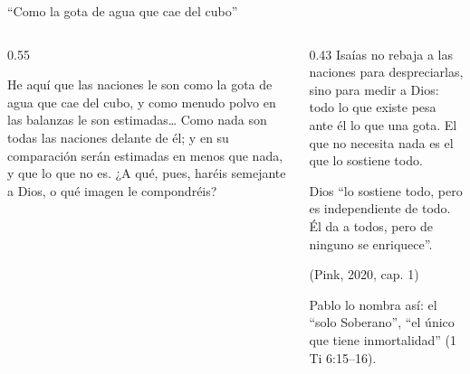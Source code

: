 \begin{frame}{``Como la gota de agua que cae del cubo''}
\begin{columns}[c,onlytextwidth]
\begin{column}{0.55\textwidth}
\begin{cita}He aquí que las naciones le son como la gota de agua que cae del cubo, y como menudo polvo en las balanzas le son estimadas\ldots{} Como nada son todas las naciones delante de él; y en su comparación serán estimadas en menos que nada, y que lo que no es. ¿A qué, pues, haréis semejante a Dios, o qué imagen le compondréis?\end{cita}
\end{column}
\begin{column}{0.43\textwidth}
\scriptsize Isaías no rebaja a las naciones para despreciarlas, sino para medir a Dios: todo lo que existe pesa ante él lo que una gota. El que no necesita nada es el que lo sostiene todo.\par\smallskip
\begin{tcolorbox}[colback=azul,colframe=dorado,boxrule=1.2pt,arc=3pt,coltext=papiro]
\centering\small Dios ``lo sostiene todo, pero es independiente de todo. Él da a todos, pero de ninguno se enriquece''.\par{\scriptsize(Pink, 2020, cap. 1)}
\end{tcolorbox}
\scriptsize Pablo lo nombra así: el ``solo Soberano'', ``el único que tiene inmortalidad'' (1 Ti 6:15--16).\par\smallskip
{}
\end{column}
\end{columns}
\end{frame}

